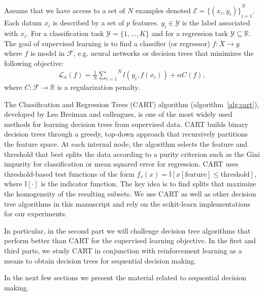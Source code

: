 \begin{definition}\label{def:sl}
    Assume that we have access to a set of $N$ examples denoted $\mathcal{E} = {\{(x_i, y_i)\}}_{i=1}^N$. Each datum $x_i$ is described by a set of $p$ features. $y_i \in {\mathcal Y}$ is the label associated with $x_i$.
    For a classification task $\mathcal{Y}=\{1,\ldots,K\}$ and for a regression task $\mathcal{Y}\subseteq \mathbb{R}$.
    The goal of supervised learning is to find a classifier (or regressor) $f:X \rightarrow  y$ where $f$ is model in $\mathcal{F}$, e.g. neural networks or decision trees that minimizes the following objective:
    \begin{align}
        \mathcal{L}_{\alpha}(f) = \frac{1}{N}\overset{N}{\underset{i=1}{\sum}}{l}(y_i, f(x_i)) + \alpha C(f),
        \label{eq:suplearning}
    \end{align}
    where $C: \mathcal{F} \rightarrow \mathbb{R}$ is a regularization penalty.
    \end{definition}

The Classification and Regression Trees (CART) algorithm \cite{breiman1984classification} (algorithm~\ref{alg:cart}), developed by Leo Breiman and colleagues, is one of the most widely used methods for learning decision trees from supervised data.
CART builds binary decision trees through a greedy, top-down approach that recursively partitions the feature space. 
At each internal node, the algorithm selects the feature and threshold that best splits the data according to a purity criterion such as the Gini impurity for classification or mean squared error for regression.
CART uses threshold-based test functions of the form $f_v(x) = \mathbb{I}[x[\text{feature}] \leq \text{threshold}]$, where $\mathbb{I}[\cdot]$ is the indicator function. 
The key idea is to find splits that maximize the homogeneity of the resulting subsets. 
We use CART as well as other decision tree algorithms in this manuscript and rely on the scikit-learn implementations \cite{scikit-learn} for our experiments.

In particular, in the second part we will challenge decision tree algorithms that perform better than CART for the supervised learning objective.
In the first and third parts, we study CART in conjunction with reinforcement learning as a means to obtain decision trees for sequential decision making.

In the next few sections we present the material related to sequential decision making.

